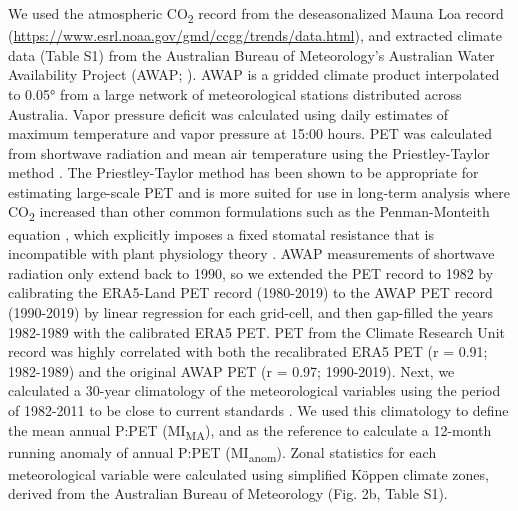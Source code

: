 \documentclass[gc, manuscript]{copernicus}
\begin{document}
We used the atmospheric CO\textsubscript{2} record from the
deseasonalized Mauna Loa record
(\url{https://www.esrl.noaa.gov/gmd/ccgg/trends/data.html}), and
extracted climate data (Table S1) from the Australian Bureau of
Meteorology's Australian Water Availability Project (AWAP;
\citet{jonesHighqualitySpatialClimate2009}). AWAP is a gridded climate
product interpolated to 0.05° from a large network of meteorological
stations distributed across Australia. Vapor pressure deficit was
calculated using daily estimates of maximum temperature and vapor
pressure at 15:00 hours. PET was calculated from shortwave radiation and
mean air temperature using the Priestley-Taylor method
\citep{davisSimpleProcessledAlgorithms2017}. The Priestley-Taylor method
has been shown to be appropriate for estimating large-scale PET
\citep{raupachEquilibriumEvaporationConvective2000} and is more suited
for use in long-term analysis where CO\textsubscript{2} increased than
other common formulations such as the Penman-Monteith equation
\citep{greveAridityIndexGlobal2019, milly_dunne16}, which explicitly
imposes a fixed stomatal resistance that is incompatible with plant
physiology theory \citep{medlyn_etal01}. AWAP measurements of shortwave
radiation only extend back to 1990, so we extended the PET record to
1982 by calibrating the ERA5-Land PET record (1980-2019) to the AWAP PET
record (1990-2019) by linear regression for each grid-cell, and then
gap-filled the years 1982-1989 with the calibrated ERA5 PET. PET from
the Climate Research Unit record \citep{harris_etal14} was highly
correlated with both the recalibrated ERA5 PET (r = 0.91; 1982-1989) and
the original AWAP PET (r = 0.97; 1990-2019). Next, we calculated a
30-year climatology of the meteorological variables using the period of
1982-2011 to be close to current standards
\citep{worldmeteorologicalorganizationWMOGuidelinesCalculation2017}. We
used this climatology to define the mean annual P:PET
(MI\textsubscript{MA}), and as the reference to calculate a 12-month
running anomaly of annual P:PET (MI\textsubscript{anom}). Zonal
statistics for each meteorological variable were calculated using
simplified Köppen climate zones, derived from the Australian Bureau of
Meteorology (Fig. 2b, Table S1).
\end{document}
